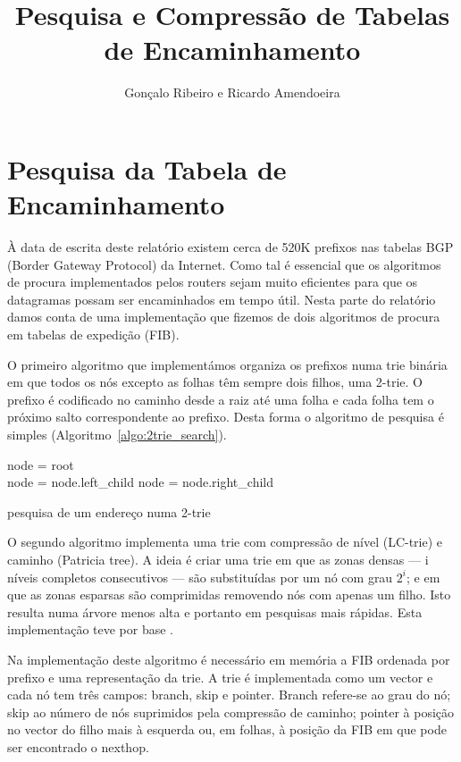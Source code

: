 \documentclass[10pt,a4paper]{article}
\author{Gonçalo Ribeiro e Ricardo Amendoeira}
\title{Pesquisa e Compressão de Tabelas de Encaminhamento}
\begin{document}
\maketitle
\section{Pesquisa da Tabela de Encaminhamento}
	À data de escrita deste relatório existem cerca de 520K prefixos nas tabelas BGP (Border Gateway Protocol) da Internet. Como tal é essencial que os algoritmos de procura implementados pelos routers sejam muito eficientes para que os datagramas possam ser encaminhados em tempo útil. Nesta parte do relatório damos conta de uma implementação que fizemos de dois algoritmos de procura em tabelas de expedição (FIB).

	O primeiro algoritmo que implementámos organiza os prefixos numa trie binária em que todos os nós excepto as folhas têm sempre dois filhos, uma \mbox{2-trie}. O prefixo é codificado no caminho desde a raiz até uma folha e cada folha tem o próximo salto correspondente ao prefixo. Desta forma o algoritmo de pesquisa é simples (Algoritmo~\ref{algo:2trie_search}).

\begin{algorithm}
	\label{algo:2trie_search}
	node = root\\
	{
		{
			{
				node = node.left\_child
			}
			\uElse
			{
				node = node.right\_child
			}
		}
		\uElse
		{
		}
	}
		\begin{comment}
			node = root
			for each bit in address, starting at MSB
				if node != leaf
					if bit == 0
						go to left child
					else
						go to right child
				else
					return node.interface
		\end{comment}
	\caption{pesquisa de um endereço numa 2-trie}
\end{algorithm}

	O segundo algoritmo implementa uma trie com compressão de nível (\mbox{LC-trie}) e caminho (Patricia tree). A ideia é criar uma trie em que as zonas densas --- i níveis completos consecutivos --- são substituídas por um nó com grau $2^i$; e em que as zonas esparsas são comprimidas removendo nós com apenas um filho. Isto resulta numa árvore menos alta e portanto em pesquisas mais rápidas. Esta implementação teve por base \cite{SNilsson99}.

Na implementação deste algoritmo é necessário em memória a FIB ordenada por prefixo e uma representação da trie. A trie é implementada como um vector e cada nó tem três campos: branch, skip e pointer. Branch refere-se ao grau do nó; skip ao número de nós suprimidos pela compressão de caminho; pointer à posição no vector do filho mais à esquerda ou, em folhas, à posição da FIB em que pode ser encontrado o nexthop.
\end{document}
